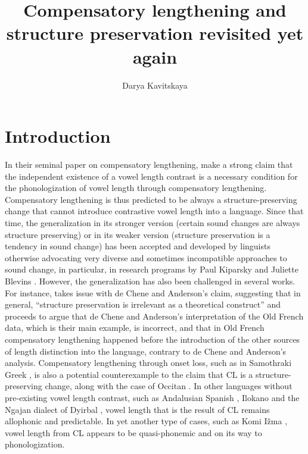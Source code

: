 \documentclass[output=paper,
modfonts
]{LSP/langsci}
\title{Compensatory lengthening and structure preservation revisited yet again}
\author{%
Darya Kavitskaya\affiliation{University of California, Berkeley}
}
\begin{document}
\maketitle



\section{Introduction}

In their seminal paper on compensatory lengthening, \citet{deChene1979} make a strong claim that the independent existence of a
vowel length contrast is a necessary condition for the phonologization
of vowel length through compensatory lengthening. Compensatory
lengthening is thus predicted to be always a structure-preserving change
that cannot introduce contrastive vowel length into a language. Since
that time, the generalization in its stronger version (certain sound
changes are always structure preserving) or in its weaker version
(structure preservation is a tendency in sound change) has been accepted
and developed by linguists otherwise advocating very diverse and
sometimes incompatible approaches to sound change, in particular, in
research programs by Paul Kiparsky \citep{kiparsky1995,kiparsky2003} and Juliette
Blevins \citep{blevins2004a,blevins2009k}. However, the generalization has also been
challenged in several works. For instance, \citet{gess1998} takes issue with
de Chene and Anderson's claim, suggesting that in general, ``structure
preservation is irrelevant as a theoretical construct'' and proceeds to
argue that de Chene and Anderson's interpretation of the Old French
data, which is their main example, is incorrect, and that in Old French
compensatory lengthening happened before the introduction of the other
sources of length distinction into the language, contrary to de Chene
and Anderson's analysis. Compensatory lengthening through onset loss,
such as in Samothraki Greek \citep{topintzi2006k,kiparsky2011k,katsika2015}, is also a potential counterexample to the claim that
CL is a structure-preserving change, along with the case of Occitan
\citep{morin1992}. In other languages without pre-existing vowel length
contrast, such as Andalusian Spanish \citep{hock1986k}, Ilokano \citep{hayes1989k}
and the Ngajan dialect of Dyirbal \citep{dixon1990}, vowel length that is the
result of CL remains allophonic and predictable. In yet another type of
cases, such as Komi Ižma \citep{harms1967,harms1968,hausenberg1998}, vowel
length from CL appears to be quasi-phonemic and on its way to
phonologization.
\end{document}
